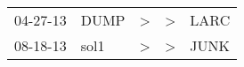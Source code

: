 \begin{supertabular}{p{0.07\textwidth}p{0.06\textwidth}p{0.02\textwidth}p{0.02\textwidth}p{0.06\textwidth}}
 04-27-13\textsuperscript{} &  DUMP\textsuperscript{} &  \textgreater &  \textgreater &  LARC\textsuperscript{} \\
 08-18-13\textsuperscript{} &  sol1\textsuperscript{} &  \textgreater &  \textgreater &  JUNK\textsuperscript{} \\
\end{supertabular}
